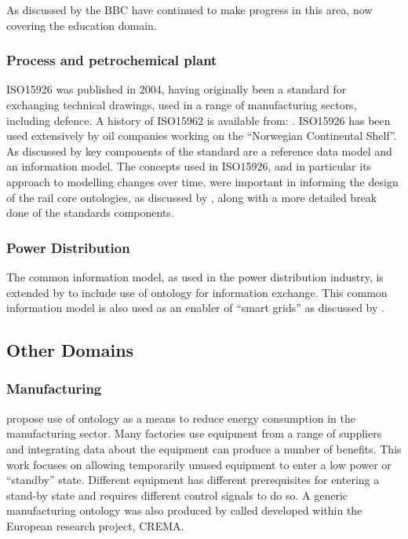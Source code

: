 As discussed by \citet{Mikroyannidi2016} the BBC have continued to make progress in this area, now covering the education domain.  
\subsubsection{Process and petrochemical plant}
 ISO15926 was published in 2004, having originally been a standard for exchanging technical drawings, used in a range of manufacturing sectors, including defence. A history of ISO15962 is available from: \citep{POSCCaesarAssociation2011}. ISO15926 has been used extensively by oil companies working on the ``Norwegian Continental Shelf''. As discussed by \citet{Leal2005} key components of the standard are a reference data model and an information model. The concepts used in ISO15926, and in particular its approach to modelling changes over time, were important in informing the design of the rail core ontologies, as discussed by \citet{Tutcher2015}, along with a more detailed break done of the standards components. 
\subsubsection{Power Distribution}
The common information model, as used in the power distribution industry, is extended by \citet{Hargreaves2013} to include use of ontology for information exchange. This common information model is also used as an enabler of ``smart grids'' as discussed by \citet{Fremont}.

\subsection{Other Domains}
 \subsubsection{Manufacturing}
\citet{Mueller2015} propose use of ontology as a means to reduce energy consumption in the manufacturing sector. Many factories use equipment from a range of suppliers and integrating data about the equipment can produce a number of benefits. This work focuses on allowing temporarily unused equipment to enter a low power or ``standby'' state. Different equipment has different prerequisites for entering a stand-by state and requires different control signals to do so. A generic manufacturing ontology was also produced by \citet{Mazzola2016} called  developed within the European research project, CREMA.
